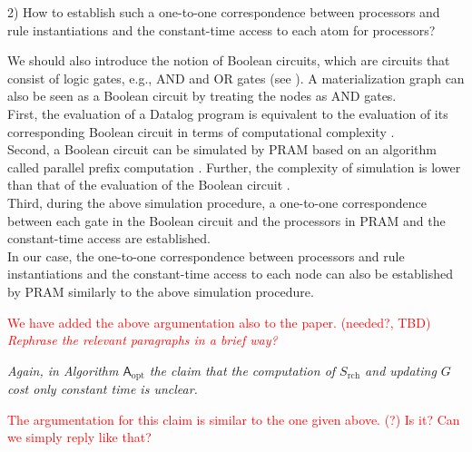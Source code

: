 \documentclass{article}
\let\quoteOld\quote
\let\endquoteOld\endquote
\renewenvironment{quote}{\quoteOld\itshape}{\endquoteOld}
\begin{document}
2) How to establish such a one-to-one correspondence between processors
and rule instantiations and the constant-time access to each atom for processors?

We should also introduce the notion of Boolean circuits, which are 
circuits that consist of logic gates, e.g., AND and OR gates (see
\cite[Section~2.3]{Raymond95}).  A materialization graph can also be
seen as a Boolean circuit by treating the nodes as AND gates.\\
%
First, the evaluation of a Datalog program is equivalent to the evaluation
of its corresponding Boolean circuit in terms of computational
complexity \cite{DMRT14a}. \\
%
Second, a Boolean circuit can be simulated by PRAM based on an
algorithm called parallel prefix computation \cite{LaFi80a}.  Further,
the complexity of simulation is lower than that of the evaluation of
the Boolean circuit \cite[Lemma~2.4.1]{Raymond95}.\\
%
Third, during the above simulation procedure, a one-to-one
correspondence between each gate in the Boolean circuit and the
processors in PRAM and the constant-time access are established.\\
%
In our case, the one-to-one correspondence between processors and rule
instantiations and the constant-time access to each node can also be
established by PRAM similarly to the above simulation procedure.

\textcolor{red}{We have added the above argumentation also to the
  paper. (needed?, TBD) \emph{Rephrase the relevant paragraphs in a brief way?}}

\begin{quote}
  Again, in Algorithm $\mathsf{A}_\text{opt}$ the claim that the
  computation of $S_\text{rch}$ and updating $G$ cost only constant
  time is unclear.
\end{quote}

\textcolor{red}{The argumentation for this claim is similar to the one
  given above. (?) Is it? Can we simply reply like that?}



\end{document}
